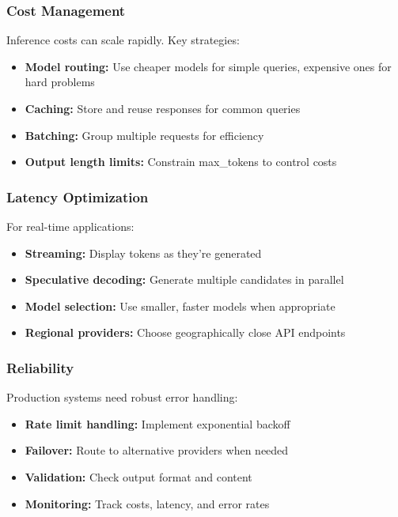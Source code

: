 \documentclass[class=article,crop=false]{standalone}
\begin{document}
\subsubsection{Cost Management}

Inference costs can scale rapidly. Key strategies:
\begin{itemize}
  \item \textbf{Model routing:} Use cheaper models for simple queries, expensive ones for hard problems
  \item \textbf{Caching:} Store and reuse responses for common queries
  \item \textbf{Batching:} Group multiple requests for efficiency
  \item \textbf{Output length limits:} Constrain max\_tokens to control costs
\end{itemize}

\subsubsection{Latency Optimization}

For real-time applications:
\begin{itemize}
  \item \textbf{Streaming:} Display tokens as they're generated
  \item \textbf{Speculative decoding:} Generate multiple candidates in parallel
  \item \textbf{Model selection:} Use smaller, faster models when appropriate
  \item \textbf{Regional providers:} Choose geographically close API endpoints
\end{itemize}

\subsubsection{Reliability}

Production systems need robust error handling:
\begin{itemize}
  \item \textbf{Rate limit handling:} Implement exponential backoff
  \item \textbf{Failover:} Route to alternative providers when needed
  \item \textbf{Validation:} Check output format and content
  \item \textbf{Monitoring:} Track costs, latency, and error rates
\end{itemize}
\end{document}
